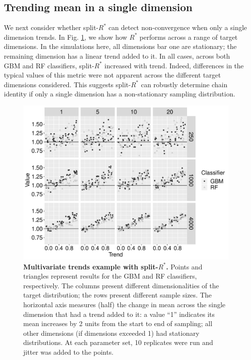 \documentclass[ba]{imsart}
\numberwithin{equation}{section}
\theoremstyle{plain}
\begin{document}
\begin{supplement}
		\subsection{Trending mean in a single dimension}\label{sec:non-stationary_single}
		We next consider whether split-$R^*$ can detect non-convergence when only a single dimension trends. In Fig. \ref{fig:trends_one_dim}, we show how $R^*$ performs across a range of target dimensions. In the simulations here, all dimensions bar one are stationary; the remaining dimension has a linear trend added to it. In all cases, across both GBM and RF classifiers, split-$R^*$ increased with trend. Indeed, differences in the typical values of this metric were not apparent across the different target dimensions considered. This suggests split-$R^*$ can robustly determine chain identity if only a single dimension has a non-stationary sampling distribution.
		
		
		\begin{figure}[!htb]
			\centerline{\includegraphics[width=1.0\textwidth]{trends_one_dim.pdf}}
			\caption{\textbf{Multivariate trends example with split-$R^*$.} Points and triangles represent results for the GBM and RF classifiers, respectively. The columns present different dimensionalities of the target distribution; the rows present different sample sizes. The horizontal axis measures (half) the change in mean across the single dimension that had a trend added to it: a value ``1'' indicates its mean increases by 2 units from the start to end of sampling; all other dimensions (if dimensions exceeded 1) had stationary distributions. At each parameter set, 10 replicates were run and jitter was added to the points.}
			\label{fig:trends_one_dim}
		\end{figure}
		

\end{supplement}
\end{document}
